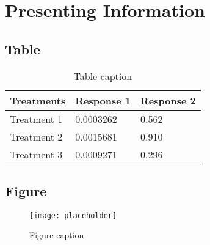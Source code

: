 



\chapter{Presenting Information}
\lipsum[1] 

\section{Table}
\lipsum[1] 
\begin{table}[h]
\centering
\begin{tabular}{l l l}
\toprule
\textbf{Treatments} & \textbf{Response 1} & \textbf{Response 2}\\
\midrule
Treatment 1 & 0.0003262 & 0.562 \\
Treatment 2 & 0.0015681 & 0.910 \\
Treatment 3 & 0.0009271 & 0.296 \\
\bottomrule
\end{tabular}
\caption{Table caption}
\end{table}


\section{Figure}
\lipsum[1] 
\begin{figure}[h]
\centering\texttt{[image: placeholder]}
\caption{Figure caption}
\end{figure}
